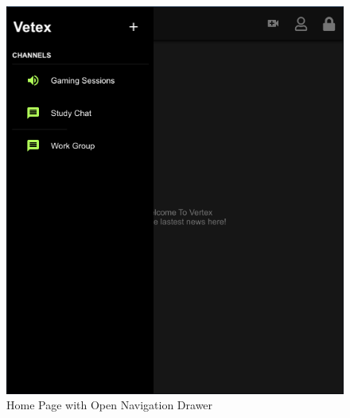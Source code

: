\begin{figure}[h!]
    \caption{Home Page with Open Navigation Drawer}
    \label{image:mainWindowOpenDrawer}
    \centering
    \includegraphics[width=1.0\textwidth]{images/resized_window_drawer_open.png}
\end{figure}

